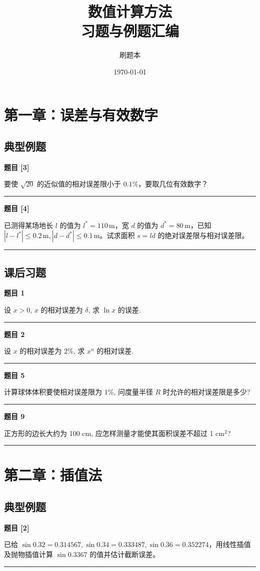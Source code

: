 \documentclass[a4paper,12pt]{ctexart}
\title{\textbf{数值计算方法\\习题与例题汇编}}
\author{刷题本}
\date{\today}
\newcommand{\problem}[1]{
    \par\noindent\textbf{题目 #1} \quad
}
\newcommand{\workspace}[1][5cm]{
    \par
    \vspace{#1}
    \noindent\rule{\textwidth}{0.1pt} %
    \vspace{0.5em}
    \par
}
\begin{document}
\maketitle

\tableofcontents
\newpage

\section{第一章：误差与有效数字}

\subsection*{典型例题}

\problem{[3]}
要使 $\sqrt{20}$ 的近似值的相对误差限小于 $0.1\%$，要取几位有效数字？
\workspace

\problem{[4]}
已测得某场地长 $l$ 的值为 $l^* = 110\,\mathrm{m}$，宽 $d$ 的值为 $d^* = 80\,\mathrm{m}$，已知 $|l - l^*| \leqslant 0.2\,\mathrm{m}, |d - d^*| \leqslant 0.1\,\mathrm{m}$。试求面积 $s = ld$ 的绝对误差限与相对误差限。
\workspace

\subsection*{课后习题}

\problem{1}
设 $x>0$, $x$ 的相对误差为 $\delta$, 求 $\ln x$ 的误差.
\workspace

\problem{2}
设 $x$ 的相对误差为 $2\%$, 求 $x^n$ 的相对误差.
\workspace[4cm]

\problem{5}
计算球体体积要使相对误差限为 $1\%$, 问度量半径 $R$ 时允许的相对误差限是多少?
\workspace[4cm]

\problem{9}
正方形的边长大约为 100 cm, 应怎样测量才能使其面积误差不超过 1 $\text{cm}^2$?
\workspace

\newpage

\section{第二章：插值法}

\subsection*{典型例题}

\problem{[2]}
已给 $\sin 0.32 = 0.314567, \sin 0.34 = 0.333487, \sin 0.36 = 0.352274$，用线性插值及抛物插值计算 $\sin 0.3367$ 的值并估计截断误差。
\workspace[8cm]
\end{document}
